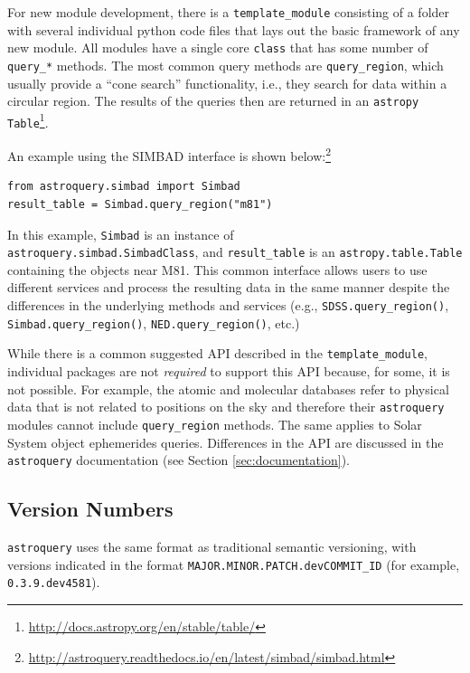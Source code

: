 \documentclass[twocolumn]{aastex62}
\newcommand{\package}[1]{\texttt{#1}\xspace}
\newcommand{\astroquery}{\package{astroquery}}
\newcommand{\astropypkg}{\package{astropy}}
\begin{document}
For new module development, there is a \texttt{template\_module} consisting of a
folder with several individual python code files that lays
out the basic framework of any new module.  All modules have a single core
\texttt{class} that has some number of \texttt{query\_*} methods.
The most common query methods are \texttt{query\_region}, which usually
provide a ``cone search'' functionality, i.e., they search for data within a
circular region. The results of
the queries then are returned in an \astropypkg
\citep{Astropy-Collaboration2018, Astropy-Collaboration2013}
\texttt{Table}\footnote{\url{http://docs.astropy.org/en/stable/table/}}.

An example using the SIMBAD interface is shown
below:\footnote{\url{http://astroquery.readthedocs.io/en/latest/simbad/simbad.html}}
\begin{lstlisting}[caption=Query SIMBAD for a region around M81]
from astroquery.simbad import Simbad
result_table = Simbad.query_region("m81")
\end{lstlisting}
In this example, \texttt{Simbad} is an instance of \\
\texttt{astroquery.simbad.SimbadClass}, and \texttt{result\_table} is an
\texttt{astropy.table.Table} containing the objects near M81.
This common interface allows users to use different services and process
the resulting data in the same manner despite the differences in the underlying
methods and services (e.g., \texttt{SDSS.query\_region()},
\texttt{Simbad.query\_region()}, \texttt{NED.query\_region()}, etc.) 

While there is a common suggested API described in the \texttt{template\_module},
individual packages are not \emph{required} to support this API because, for
some, it is not possible.  For example, the atomic and molecular databases refer
to physical data that is not related to positions on the sky and therefore
their \astroquery modules cannot include \texttt{query\_region} methods. The
same applies to Solar System object ephemerides queries. Differences in the API
are discussed in the \astroquery documentation (see Section
\ref{sec:documentation}).

\subsection{Version Numbers}
\label{sec:versionnumbers}
\astroquery uses the same format as traditional semantic versioning,
with versions indicated in the format \texttt{MAJOR.MINOR.PATCH.devCOMMIT\_ID} (for
example, \texttt{0.3.9.dev4581}).
\end{document}
